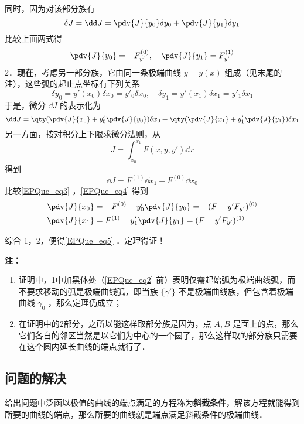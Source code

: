 同时，因为对该部分族有
\begin{equation}
\delta J=\dd J=\pdv{J}{y_0}\delta y_0+\pdv{J}{y_1}\delta y_1
\end{equation}
比较上面两式得
\begin{equation}
\pdv{J}{y_0}=-F_{y'}^{(0)},\quad \pdv{J}{y_1}=F_{y'}^{(1)}
\end{equation}
2．\textbf{现在}，考虑另一部分族，它由同一条极端曲线 $y=y(x)$ 组成（见末尾的注），这些弧的起止点坐标有下列关系
\begin{equation}
\delta y_0=y'(x_0)\delta x_0=y'_0\delta x_0,\quad \delta y_1=y'(x_1)\delta x_1=y'_1\delta x_1
\end{equation}
于是，微分 $\dd J$ 的表示化为
\begin{equation}\label{EPQue_eq3}
\dd J=\qty(\pdv{J}{x_0}+y'_0\pdv{J}{y_0})\delta x_0+\qty(\pdv{J}{x_1}+y'_1\pdv{J}{y_1})\delta x_1
\end{equation}
另一方面，按对积分上下限求微分法则，从
\begin{equation}
J=\int_{x_0}^{x_1}F(x,y,y')\dd x
\end{equation}
得到
\begin{equation}\label{EPQue_eq4}
\dd J=F^{(1)}\dd x_1-F^{(0)}\dd x_0
\end{equation}
比较\autoref{EPQue_eq3} ，\autoref{EPQue_eq4} 得到
\begin{equation}
\begin{aligned}
&\pdv{J}{x_0}=-F^{(0)}-y'_0\pdv{J}{y_0}=-(F-y'F_{y'})^{(0)}\\
&\pdv{J}{x_1}=F^{(1)}-y'_1\pdv{J}{y_1}=(F-y'F_{y'})^{(1)}
\end{aligned}
\end{equation}

综合 1，2，便得\autoref{EPQue_eq5} ．定理得证！

\textbf{注：}
\begin{enumerate}
\item 证明中，1中加黑体处（\autoref{EPQue_eq2} 前）表明仅需起始弧为极端曲线弧，而不要求移动的弧是极端曲线弧，即当族 $\{\gamma'\}$ 不是极端曲线族，但包含着极端曲线 $\gamma_0$ ，那么定理仍成立；
\item 在证明中的2部分，之所以能这样取部分族是因为，点 $A,B$ 是面上的点，那么它们各自的邻区当然是以它们为中心的一个圆了，那么这样取的部分族只需要在这个圆内延长曲线的端点就行了．
\end{enumerate}
\subsection{问题的解决}
给出问题中泛函以极值的曲线的端点满足的方程称为\textbf{斜截条件}，解该方程就能得到所要的曲线的端点，那么所要的曲线就是端点满足斜截条件的极端曲线．